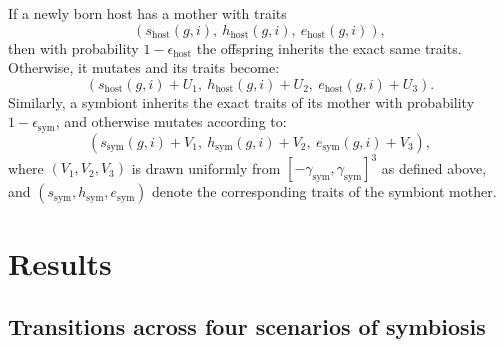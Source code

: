 \documentclass[a4paper]{article}
\begin{document}
\begin{enumerate}
If a newly born host has a mother with traits 
\[
(s_{\text{host}}(g,i),\ h_{\text{host}}(g,i),\ e_{\text{host}}(g,i)),
\]
then with probability $1 - \epsilon_{\text{host}}$ the offspring inherits the exact same traits. Otherwise, it mutates and its traits become:
\[
\left(
s_{\text{host}}(g,i) + U_1,\ 
h_{\text{host}}(g,i) + U_2,\ 
e_{\text{host}}(g,i) + U_3
\right).
\]
Similarly, a symbiont inherits the exact traits of its mother with probability $1 - \epsilon_{\text{sym}}$, and otherwise mutates according to:
\[
\left(
s_{\text{sym}}(g,i) + V_1,\ 
h_{\text{sym}}(g,i) + V_2,\ 
e_{\text{sym}}(g,i) + V_3
\right),
\]
where $(V_1, V_2, V_3)$ is drawn uniformly from $[-\gamma_{\text{sym}}, \gamma_{\text{sym}}]^3$ as defined above, and $(s_{\text{sym}}, h_{\text{sym}}, e_{\text{sym}})$ denote the corresponding traits of the symbiont mother. 



\end{enumerate}

\section{Results}\label{sec:results}


\subsection{Transitions across four scenarios of symbiosis}\label{sec:four_scenarios}
\end{document}
